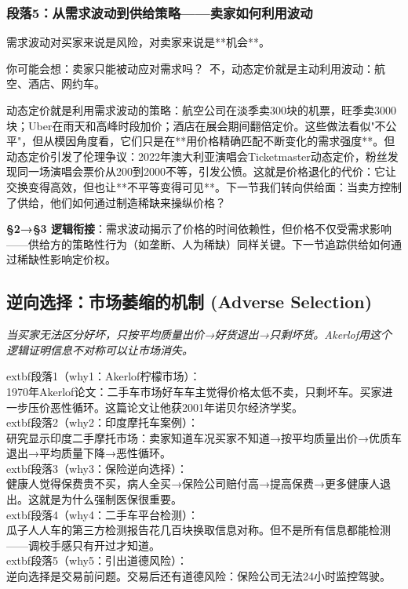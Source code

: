 \documentclass[a4paper,12pt]{book}
\newenvironment{motivation}{\begin{tcolorbox}[colback=gray!10,colframe=gray!60,title=\textit{动机}]\small\itshape}{\end{tcolorbox}}
\begin{document}
	\subsubsection*{段落5：从需求波动到供给策略——卖家如何利用波动}
	需求波动对买家来说是风险，对卖家来说是**机会**。
	\begin{tcolorbox}[colback=yellow!5, title=\textit{读者行为预测}]
		你可能会想：卖家只能被动应对需求吗？\ 不，动态定价就是主动利用波动：航空、酒店、网约车。
	\end{tcolorbox}

动态定价就是利用需求波动的策略：航空公司在淡季卖300块的机票，旺季卖3000块；Uber在雨天和高峰时段加价；酒店在展会期间翻倍定价。这些做法看似"不公平"，但从模因角度看，它们只是在**用价格精确匹配不断变化的需求强度**。但动态定价引发了伦理争议：2022年澳大利亚演唱会Ticketmaster动态定价，粉丝发现同一场演唱会票价从200到2000不等，引发公愤。这就是价格退化的代价：它让交换变得高效，但也让**不平等变得可见**。下一节我们转向供给面：当卖方控制了供给，他们如何通过制造稀缺来操纵价格？

	\textbf{§2→§3 逻辑衔接}：需求波动揭示了价格的时间依赖性，但价格不仅受需求影响——供给方的策略性行为（如垄断、人为稀缺）同样关键。下一节追踪供给如何通过稀缺性影响定价权。

	
	\subsection{逆向选择：市场萎缩的机制 (Adverse Selection)}
	\begin{motivation}当买家无法区分好坏，只按平均质量出价→好货退出→只剩坏货。Akerlof用这个逻辑证明信息不对称可以让市场消失。\end{motivation}
		extbf{段落1（why1：Akerlof柠檬市场）}：\\1970年Akerlof论文：二手车市场好车车主觉得价格太低不卖，只剩坏车。买家进一步压价恶性循环。这篇论文让他获2001年诺贝尔经济学奖。\\	extbf{段落2（why2：印度摩托车案例）}：\\研究显示印度二手摩托市场：卖家知道车况买家不知道→按平均质量出价→优质车退出→平均质量下降→恶性循环。\\	extbf{段落3（why3：保险逆向选择）}：\\健康人觉得保费贵不买，病人全买→保险公司赔付高→提高保费→更多健康人退出。这就是为什么强制医保很重要。\\	extbf{段落4（why4：二手车平台检测）}：\\瓜子人人车的第三方检测报告花几百块换取信息对称。但不是所有信息都能检测——调校手感只有开过才知道。\\	extbf{段落5（why5：引出道德风险）}：\\逆向选择是交易前问题。交易后还有道德风险：保险公司无法24小时监控驾驶。
\end{document}
